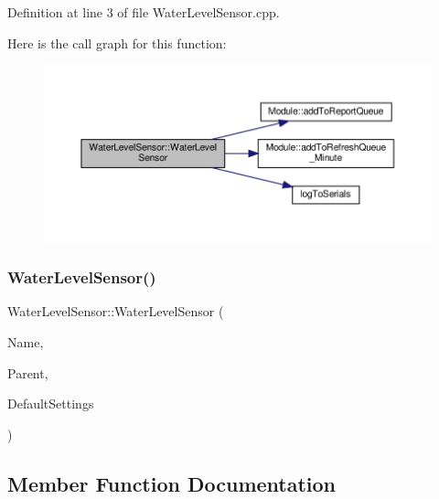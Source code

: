 Definition at line 3 of file Water\+Level\+Sensor.\+cpp.

Here is the call graph for this function\+:
\nopagebreak
\begin{figure}[H]
\begin{center}
\leavevmode
\includegraphics[width=350pt]{class_water_level_sensor_aae6f402057511b5a9c30024dc483244c_cgraph}
\end{center}
\end{figure}
\mbox{\label{class_water_level_sensor_aae6f402057511b5a9c30024dc483244c}} 
\subsubsection{\texorpdfstring{Water\+Level\+Sensor()}{WaterLevelSensor()}\hspace{0.1cm}{\footnotesize\ttfamily [2/2]}}
{\footnotesize\ttfamily Water\+Level\+Sensor\+::\+Water\+Level\+Sensor (\begin{DoxyParamCaption}\item[{const \+\_\+\+\_\+\+Flash\+String\+Helper $\ast$}]{Name,  }\item[{\hyperlink{class_module}{Module} $\ast$}]{Parent,  }\item[{\hyperlink{struct_settings_1_1_water_level_sensor_settings}{Settings\+::\+Water\+Level\+Sensor\+Settings} $\ast$}]{Default\+Settings }\end{DoxyParamCaption})}



\subsection{Member Function Documentation}
\mbox{\label{class_water_level_sensor_ae5a376c1a3ba9cc65a957f1c5cd6ddc0}} 
